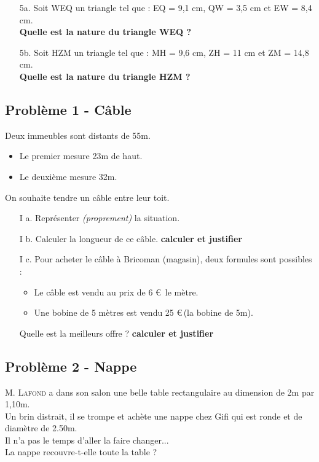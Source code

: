 \documentclass[12pt]{article}
\begin{document}
\begin{enumerate}
  \item[5a.]Soit WEQ un triangle tel que : EQ = 9,1 cm, QW = 3,5 cm et EW = 8,4 cm.\\
  \textbf{Quelle est la nature du triangle WEQ ?}

  \item[5b.]Soit HZM un triangle tel que : MH = 9,6 cm, ZH = 11 cm et ZM = 14,8 cm. \\
  \textbf{Quelle est la nature du triangle HZM ?}
\end{enumerate}

\subsection*{Problème 1 - Câble}

Deux immeubles sont distants de 55m. 
  \begin{itemize}
  \item Le premier mesure 23m de haut.
  \item Le deuxième mesure 32m. 
  \end{itemize}

On souhaite tendre un câble entre leur toit. 

\begin{enumerate}
  \item[I a.] Représenter \textit{(proprement)} la situation.

  \item[I b.] Calculer la longueur de ce câble. \textbf{calculer et justifier}

  \item[I c.] Pour acheter le câble à Bricoman (magasin), deux formules sont possibles :  
  \begin{itemize}
  \item Le câble est vendu  au prix de 6 \euro \, le mètre. 
  \item Une bobine de 5 mètres est vendu 25 \euro \,(la bobine de 5m). 
  \end{itemize} 
  Quelle est la meilleurs offre ? \textbf{calculer et justifier}
\end{enumerate}

\subsection*{Problème 2 - Nappe}

\textsc{M. Lafond} a dans son salon une belle table rectangulaire au dimension de 2m par 1,10m. \\
Un brin distrait, il se trompe et achète une nappe chez Gifi qui est ronde et de diamètre de 2.50m. \\
Il n'a pas le temps d'aller la faire changer... \\
La nappe recouvre-t-elle toute la table ?
\end{document}
